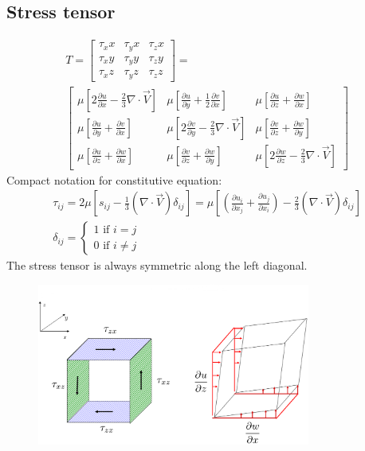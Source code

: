 \documentclass[class=report, crop=false, 12pt,a4paper]{standalone}
\begin{document}
\subsection{Stress tensor}
\begin{gather}
  T = \begin{bmatrix}
    \tau_xx & \tau_yx & \tau_zx\\
    \tau_xy & \tau_yy & \tau_zy\\
    \tau_xz & \tau_yz & \tau_zz
  \end{bmatrix} = \\ 
  \begin{bmatrix}
    \mu \left[ 2 \frac{\partial u}{\partial x} - \frac{2}{3} \nabla \cdot \vec{V} \right] & \mu \left[ \frac{\partial u}{\partial y} + \frac{1}{2} \frac{\partial v}{\partial x} \right] & \mu \left[ \frac{\partial u}{\partial z} + \frac{\partial w}{\partial x} \right]\\
    \mu \left[ \frac{\partial u}{\partial y} + \frac{\partial v}{\partial x} \right] & \mu\left[ 2\frac{\partial v}{\partial y} - \frac{2}{3}\nabla \cdot \vec{V} \right] & \mu \left[ \frac{\partial v}{\partial z} + \frac{\partial w}{\partial y} \right] \\
    \mu \left[ \frac{\partial u}{\partial z} + \frac{\partial w}{\partial x} \right] & \mu \left[ \frac{\partial v}{\partial z} + \frac{\partial w}{\partial y} \right] & \mu \left[ 2\frac{\partial w}{\partial z} - \frac{2}{3}\nabla \cdot \vec{V} \right]
  \end{bmatrix}
\end{gather}
Compact notation for constitutive equation:
\begin{gather}
  \tau_{ij} = 2\mu \left[ s_{ij} - \frac{1}{3}(\nabla \cdot \vec{V}) \delta_{ij} \right] = \mu \left[ \left(\frac{\partial u_i}{\partial x_j} + \frac{\partial u_j}{\partial x_i} \right) - \frac{2}{3}(\nabla \cdot \vec{V}) \delta_{ij} \right]\\
  \delta_{ij} = \begin{cases}
    1 \textrm{ if } i = j\\
    0 \textrm{ if } i \neq j
  \end{cases} 
\end{gather}
The stress tensor is always symmetric along the left diagonal.
\begin{figure}[H]
  \centering
  \includegraphics[width = 0.8\textwidth]{../img/diagram8.png}
\end{figure}
\end{document}

